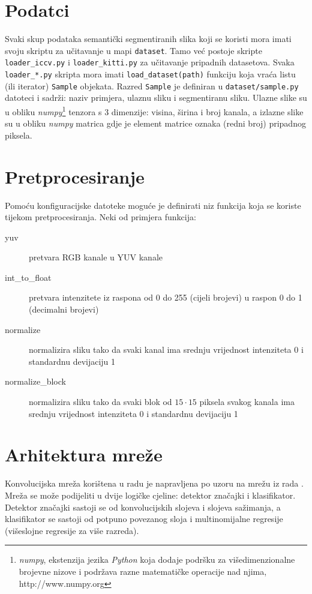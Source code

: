 \documentclass[times, utf8, diplomski, numeric]{fer}
\begin{document}
\section{Podatci}
Svaki skup podataka semantički segmentiranih slika koji se koristi mora imati svoju skriptu za učitavanje u mapi \texttt{dataset}. Tamo već postoje skripte \texttt{loader\_iccv.py} i \texttt{loader\_kitti.py} za učitavanje pripadnih datasetova. Svaka \texttt{loader\_*.py} skripta mora imati \texttt{load\_dataset(path)} funkciju koja vraća listu (ili iterator) \texttt{Sample} objekata. Razred \texttt{Sample} je definiran u \texttt{dataset/sample.py} datoteci i sadrži: naziv primjera, ulaznu sliku i segmentiranu sliku. Ulazne slike su u obliku \emph{numpy}\footnote{\textit{numpy}, ekstenzija jezika \textit{Python} koja dodaje podršku za višedimenzionalne brojevne nizove i podržava razne matematičke operacije nad njima, http://www.numpy.org} tenzora s 3 dimenzije: visina, širina i broj kanala, a izlazne slike su u obliku \emph{numpy} matrica gdje je element matrice oznaka (redni broj) pripadnog piksela.

\section{Pretprocesiranje}
Pomoću konfiguracijske datoteke moguće je definirati niz funkcija koja se koriste tijekom pretprocesiranja. Neki od primjera funkcija:
\begin{description}
  \item[yuv] pretvara RGB kanale u YUV kanale
  \item[int\_to\_float] pretvara intenzitete iz raspona od 0 do 255 (cijeli brojevi) u raspon 0 do 1 (decimalni brojevi)
  \item[normalize] normalizira sliku tako da svaki kanal ima srednju vrijednost intenziteta 0 i standardnu devijaciju 1
  \item[normalize\_block] normalizira sliku tako da svaki blok od $15 \cdot 15$ piksela svakog kanala ima srednju vrijednost intenziteta 0 i standardnu devijaciju 1
\end{description}


\section{Arhitektura mreže}
\label{chap:net_architecture}

Konvolucijska mreža korištena u radu je napravljena po uzoru na mrežu iz rada \cite{farabet_pami}. Mreža se može podijeliti u dvije logičke cjeline: detektor značajki i klasifikator. Detektor značajki sastoji se od konvolucijskih slojeva i slojeva sažimanja, a klasifikator se sastoji od potpuno povezanog sloja i multinomijalne regresije (višeslojne regresije za više razreda).
\end{document}
